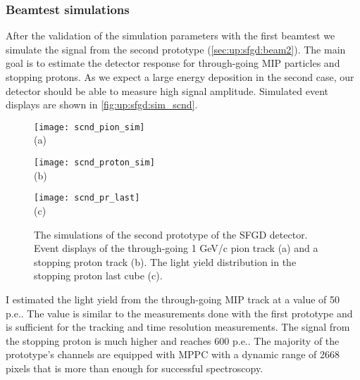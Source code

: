 \documentclass[main.tex]{subfiles}
\begin{document}
\subsubsection{Beamtest simulations}
After the validation of the simulation parameters with the first beamtest we simulate the signal from the second prototype (\autoref{sec:up:sfgd:beam2}). The main goal is to estimate the detector response for through-going MIP particles and stopping protons. As we expect a large energy deposition in the second case, our detector should be able to measure high signal amplitude. Simulated event displays are shown in \autoref{fig:up:sfgd:sim_scnd}.

\begin{figure}[!ht]
	\centering
	\begin{minipage}{0.33\linewidth}
		\centering
		\texttt{[image: scnd\_pion\_sim]} \\ (a)
	\end{minipage}
	\begin{minipage}{0.33\linewidth}
		\centering
		\texttt{[image: scnd\_proton\_sim]} \\ (b)
	\end{minipage}
	\begin{minipage}{0.33\linewidth}
		\centering
		\texttt{[image: scnd\_pr\_last]} \\ (c)
	\end{minipage}
	\caption{The simulations of the second prototype of the SFGD detector. Event displays of the through-going 1 GeV/c pion track (a) and a stopping proton track (b). The light yield distribution in the stopping proton last cube (c).}
	\label{fig:up:sfgd:sim_scnd}
\end{figure}

I estimated the light yield from the through-going MIP track at a value of 50 p.e.. The value is similar to the measurements done with the first prototype and is sufficient for the tracking and time resolution measurements. The signal from the stopping proton is much higher and reaches 600 p.e.. The majority of the prototype's channels are equipped with MPPC with a dynamic range of 2668 pixels that is more than enough for successful spectroscopy.
\end{document}
